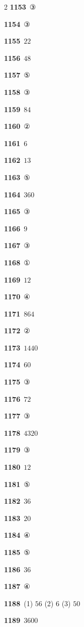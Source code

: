 \documentclass[10pt,a4paper]{article}
\begin{document}
\begin{multicols}{2}
\noindent\textbf{1153}\ ③\par
\noindent\textbf{1154}\ ③\par
\noindent\textbf{1155}\ $22$\par
\noindent\textbf{1156}\ $48$\par
\noindent\textbf{1157}\ ⑤\par
\noindent\textbf{1158}\ ③\par
\noindent\textbf{1159}\ $84$\par
\noindent\textbf{1160}\ ②\par
\noindent\textbf{1161}\ $6$\par
\noindent\textbf{1162}\ $13$\par
\noindent\textbf{1163}\ ⑤\par
\noindent\textbf{1164}\ $360$\par
\noindent\textbf{1165}\ ③\par
\noindent\textbf{1166}\ $9$\par
\noindent\textbf{1167}\ ③\par
\noindent\textbf{1168}\ ①\par
\noindent\textbf{1169}\ $12$\par
\noindent\textbf{1170}\ ④\par
\noindent\textbf{1171}\ $864$\par
\noindent\textbf{1172}\ ②\par
\noindent\textbf{1173}\ $1440$\par
\noindent\textbf{1174}\ $60$\par
\noindent\textbf{1175}\ ③\par
\noindent\textbf{1176}\ $72$\par
\noindent\textbf{1177}\ ③\par
\noindent\textbf{1178}\ $4320$\par
\noindent\textbf{1179}\ ③\par
\noindent\textbf{1180}\ $12$\par
\noindent\textbf{1181}\ ⑤\par
\noindent\textbf{1182}\ $36$\par
\noindent\textbf{1183}\ $20$\par
\noindent\textbf{1184}\ ④\par
\noindent\textbf{1185}\ ⑤\par
\noindent\textbf{1186}\ $36$\par
\noindent\textbf{1187}\ ④\par
\noindent\textbf{1188}\ (1) $56$ (2) $6$ (3) $50$\par
\noindent\textbf{1189}\ $3600$\par

\end{multicols}
\end{document}
